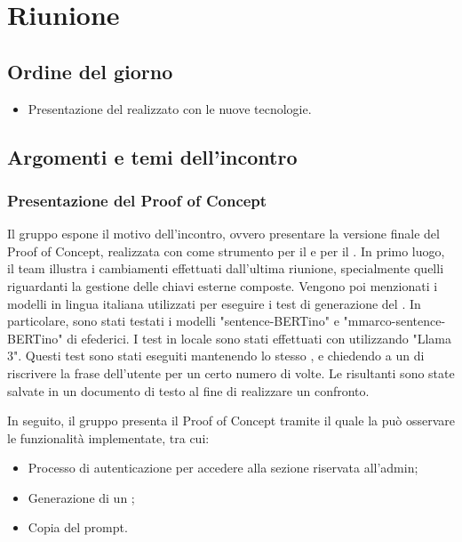 \section{Riunione}
\subsection{Ordine del giorno}
\begin{itemize}
	\item Presentazione del  realizzato con le nuove tecnologie.
\end{itemize}

\subsection{Argomenti e temi dell'incontro}

\subsubsection{Presentazione del Proof of Concept}

\par Il gruppo espone il motivo dell'incontro, ovvero presentare la versione finale del Proof of Concept, realizzata con  come strumento per il  e  per il .
In primo luogo, il team illustra i cambiamenti effettuati dall'ultima riunione, specialmente quelli riguardanti la gestione delle chiavi esterne composte.
Vengono poi menzionati i modelli in lingua italiana utilizzati per eseguire i test di generazione del . In particolare, sono stati testati i modelli "sentence-BERTino" e "mmarco-sentence-BERTino" di efederici. I test in locale sono stati effettuati con  utilizzando "Llama 3". 
Questi test sono stati eseguiti mantenendo lo stesso , e chiedendo a un  di riscrivere la frase dell'utente per un certo numero di volte. Le  risultanti sono state salvate in un documento di testo al fine di realizzare un confronto.

\par In seguito, il gruppo presenta il Proof of Concept tramite il quale la  può osservare le funzionalità implementate, tra cui:
\begin{itemize}
	\item Processo di autenticazione per accedere alla sezione riservata all'admin;
	\item Generazione di un ;
	\item Copia del prompt.
\end{itemize}

